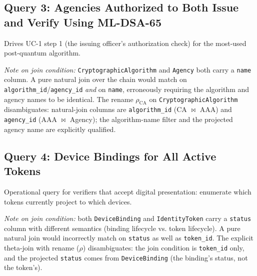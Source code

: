 \documentclass[11pt,letterpaper]{article}
\newcommand{\entity}[1]{\texttt{\color{navydark}#1}}
\begin{document}
\subsection*{Query 3: Agencies Authorized to Both Issue and Verify Using ML-DSA-65}

Drives UC-1 step 1 (the issuing officer's authorization check) for the most-used post-quantum algorithm.

\vspace{2pt}
\noindent{}

\vspace{2pt}
\noindent\textit{Note on join condition:} \entity{CryptographicAlgorithm} and \entity{Agency} both carry a \texttt{name} column. A pure natural join over the chain would match on \texttt{algorithm\_id}/\texttt{agency\_id} \textit{and} on \texttt{name}, erroneously requiring the algorithm and agency names to be identical. The rename $\rho_{\text{CA}}$ on \entity{CryptographicAlgorithm} disambiguates: natural-join columns are \texttt{algorithm\_id} (CA $\bowtie$ AAA) and \texttt{agency\_id} (AAA $\bowtie$ Agency); the algorithm-name filter and the projected agency name are explicitly qualified.

\subsection*{Query 4: Device Bindings for All Active Tokens}

Operational query for verifiers that accept digital presentation: enumerate which tokens currently project to which devices.

\vspace{2pt}
\noindent{}

\vspace{2pt}
\noindent\textit{Note on join condition:} both \entity{DeviceBinding} and \entity{IdentityToken} carry a \texttt{status} column with different semantics (binding lifecycle vs. token lifecycle). A pure natural join would incorrectly match on \texttt{status} as well as \texttt{token\_id}. The explicit theta-join with rename ($\rho$) disambiguates: the join condition is \texttt{token\_id} only, and the projected \texttt{status} comes from \entity{DeviceBinding} (the binding's status, not the token's).
\end{document}
